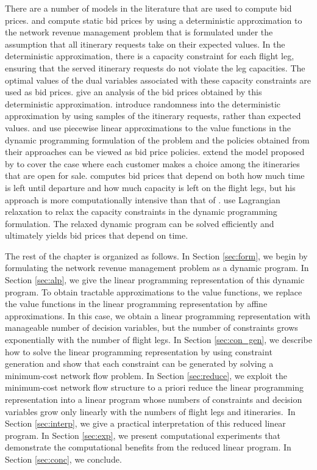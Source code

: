 There are a number of models in the literature that are used to compute bid prices.  and  compute static bid prices by using a deterministic approximation to the network revenue management problem that is formulated under the assumption that all itinerary requests take on their expected values. In the deterministic approximation, there is a capacity constraint for each flight leg, ensuring that the served itinerary requests do not violate the leg capacities. The optimal values of the dual variables associated with these capacity constraints are used as bid prices.  give an analysis of the bid prices obtained by this deterministic approximation.  introduce randomness into the deterministic approximation by using samples of the itinerary requests, rather than expected values.  and  use piecewise linear approximations to the value functions in the dynamic programming formulation of the problem and the policies obtained from their approaches can be viewed as bid price policies.  extend the model proposed by  to cover the case where each customer makes a choice among the itineraries that are open for sale.  computes bid prices that depend on both how much time is left until departure and how much capacity is left on the flight legs, but his approach is more computationally intensive than that of .  use Lagrangian relaxation to relax the capacity constraints in the dynamic programming formulation. The relaxed dynamic program can be solved efficiently and ultimately yields bid prices that depend on time.

The rest of the chapter is organized as follows. In Section \ref{sec:form}, we begin by formulating the network revenue management problem as a dynamic program. In Section \ref{sec:alp}, we give the  linear programming representation of this dynamic program. To obtain tractable approximations to the value functions, we replace the value functions in the linear programming representation by affine approximations. In this case, we obtain a linear programming representation with manageable number of decision variables, but the number of constraints grows exponentially with the number of flight legs. In Section \ref{sec:con_gen}, we describe how to solve the linear programming representation by using constraint generation and show that each constraint can be generated by solving a minimum-cost network flow problem. In Section \ref{sec:reduce}, we exploit the minimum-cost network flow structure to a priori reduce the linear programming representation into a linear program whose numbers of constraints and decision variables grow only linearly with the numbers of flight legs and itineraries.~In Section \ref{sec:interp}, we give a practical interpretation of this reduced linear program. In Section \ref{sec:exp}, we present computational experiments that demonstrate the computational benefits from the reduced linear program. In Section \ref{sec:conc}, we conclude.

